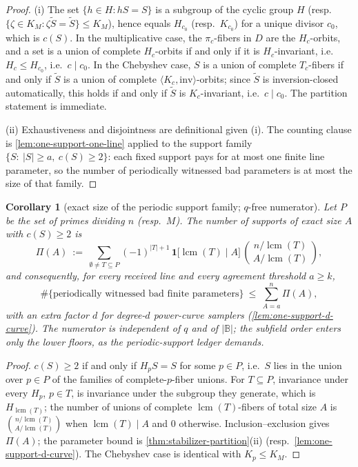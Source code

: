 \documentclass[11pt]{article}
\newtheorem{corollary}[corollary]{Corollary}
\theoremstyle{definition}
\theoremstyle{remark}
\newcommand{\B}{\mathbb{B}}
\begin{document}
\begin{proof}
(i) The set $\{h\in H:hS=S\}$ is a subgroup of the cyclic group $H$ (resp.\ $\{\zeta\in K_M:\zeta\widetilde S=\widetilde S\}\le K_M$), hence equals $H_{c_0}$ (resp.\ $K_{c_0}$) for a unique divisor $c_0$, which is $c(S)$. In the multiplicative case, the $\pi_c$-fibers in $D$ are the $H_c$-orbits, and a set is a union of complete $H_c$-orbits if and only if it is $H_c$-invariant, i.e.\ $H_c\le H_{c_0}$, i.e.\ $c\mid c_0$. In the Chebyshev case, $S$ is a union of complete $T_c$-fibers if and only if $\widetilde S$ is a union of complete $\langle K_c,\mathrm{inv}\rangle$-orbits; since $\widetilde S$ is inversion-closed automatically, this holds if and only if $\widetilde S$ is $K_c$-invariant, i.e.\ $c\mid c_0$. The partition statement is immediate.

(ii) Exhaustiveness and disjointness are definitional given (i). The counting clause is \cref{lem:one-support-one-line} applied to the support family $\{S:\ |S|\ge a,\ c(S)\ge2\}$: each fixed support pays for at most one finite line parameter, so the number of periodically witnessed bad parameters is at most the size of that family.
\end{proof}

\begin{corollary}[exact size of the periodic support family; $q$-free numerator]\label{cor:periodic-support-count}
Let $P$ be the set of primes dividing $n$ \textup(resp.\ $M$\textup). The number of supports of exact size $A$ with $c(S)\ge2$ is
\[
\Pi(A)\ :=\ \sum_{\emptyset\ne T\subseteq P}(-1)^{|T|+1}\,
\mathbf 1\bigl[\operatorname{lcm}(T)\mid A\bigr]\,
\binom{\,n/\operatorname{lcm}(T)\,}{\,A/\operatorname{lcm}(T)\,},
\]
and consequently, for every received line and every agreement threshold $a\ge k$,
\[
\#\{\text{periodically witnessed bad finite parameters}\}\ \le\ \sum_{A=a}^{n}\Pi(A),
\]
with an extra factor $d$ for degree-$d$ power-curve samplers \textup(\cref{lem:one-support-d-curve}\textup). The numerator is independent of $q$ and of $|\B|$; the subfield order enters only the lower floors, as the periodic-support ledger demands.
\end{corollary}

\begin{proof}
$c(S)\ge2$ if and only if $H_pS=S$ for some $p\in P$, i.e.\ $S$ lies in the union over $p\in P$ of the families of complete-$p$-fiber unions. For $T\subseteq P$, invariance under every $H_p$, $p\in T$, is invariance under the subgroup they generate, which is $H_{\operatorname{lcm}(T)}$; the number of unions of complete $\operatorname{lcm}(T)$-fibers of total size $A$ is $\binom{n/\operatorname{lcm}(T)}{A/\operatorname{lcm}(T)}$ when $\operatorname{lcm}(T)\mid A$ and $0$ otherwise. Inclusion--exclusion gives $\Pi(A)$; the parameter bound is \cref{thm:stabilizer-partition}(ii) \textup(resp.\ \cref{lem:one-support-d-curve}\textup). The Chebyshev case is identical with $K_p\le K_M$.
\end{proof}
\end{document}
